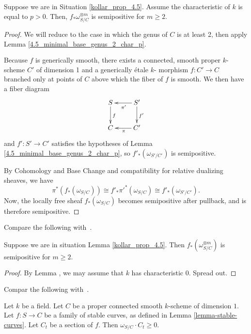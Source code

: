 \begin{lemma}\label{4.5_char_p}
Suppose we are in Situation \ref{kollar_prop_4.5}.
Assume the characteristic of $k$ is equal to $p>0$.
Then, $f_*\omega_{S/C}^{\otimes m}$ is semipositive for $m \geq 2$.
\end{lemma}

\begin{proof}
We will reduce to the case in which the genus of $C$ is at least 2, then apply
Lemma \ref{4.5_minimal_base_genus_2_char_p}.

Because $f$ is generically smooth, there exists a connected, smooth proper $k$-scheme $C'$ of dimension 1 and a generically \'{e}tale $k$- morphism $f:C'\to C$ branched only at points of $C$ above which the fiber of $f$ is smooth. We then have a fiber diagram
$$
\xymatrix{
S \ar[d]^f  &S' \ar[d]^{f'} \ar[l]^{\pi'} \\
C   &C' \ar[l]^{\pi}
}
$$
and $f':S'\to C'$ satisfies the hypotheses of Lemma \ref{4.5_minimal_base_genus_2_char_p}, so $f'_*(\omega_{S'/C'})$ is semipositive.

By Cohomology and Base Change and compatibility for relative dualizing sheaves, we have
$$
\pi^*(f_*(\omega_{S/C}))\cong f'_*\pi'^*(\omega_{S/C})\cong f'_*(\omega_{S'/C'}).
$$
Now, the locally free sheaf $f_{*}(\omega_{S/C})$ becomes semipositive after pullback, and is therefore semipositive.
\end{proof}



Compare the following with~\cite[Theorem 4.3]{ko90}.

\begin{lemma}
\label{lemma-stable-curves-semipositive}
Suppose we are in situation Lemma \ref{kollar_prop_4.5}.
Then $f_*(\omega_{S/C}^{\otimes m})$ is semipositive for $m \geq 2$.
\end{lemma}

\begin{proof}
By Lemma \label{4.5_char_p}, we may assume that $k$ has characteristic 0.
Spread out. 
\end{proof}

Compar the following with~\cite[Theorem 4.6]{ko90}.

\begin{lemma}
\label{lemma-stable-curves-semipositive}
Let $k$ be a field.
Let $C$ be a proper connected smooth $k$-scheme of dimension $1$.
Let $f : S \to C$ be a family of stable curves,
as defined in Lemma \ref{lemma-stable-curves}.
Let $C_t$ be a section of $f$.
Then $\omega_{S/C}\cdot C_t\geq 0$.
\end{lemma}

